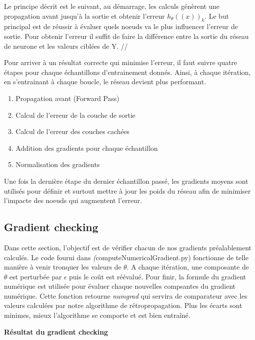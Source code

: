 Le principe décrit est le suivant, au démarrage, les calculs génèrent une propagation avant jusqu'à
la sortie et obtenir l'erreur $h_{\theta}((x))_k$. Le but principal est de réussir à évaluer quels noeuds
va le plus influencer l'erreur de sortie. Pour obtenir l'erreur il suffit de faire la différence entre la
sortie du réseau de neurone et les valeurs ciblées de Y. //

Pour arriver à un résultat correcte qui minimise l'erreur, il faut suivre quatre étapes pour chaque échantillons
d'entrainement donnés. Ainsi, à chaque itération, en s'entrainant à chaque boucle, le réseau devient plus
performant. 

\begin{enumerate}
    \item Propagation avant (Forward Pass)
    \item Calcul de l'erreur de la couche de sortie
    \item Calcul de l'erreur des couches cachées
    \item Addition des gradients pour chaque échantillon
    \item Normalisation des gradients
\end{enumerate}

Une fois la dernière étape du dernier échantillon passé, les gradients moyens sont utilisés pour définir
et surtout mettre à jour les poids du réseau afin de minimiser l'impacte des noeuds qui augmentent l'erreur. 

\subsection{Gradient checking}

Dans cette section, l'objectif est de vérifier chacun de nos gradients préalablement calculés. Le code fourni
dans \textit(computeNumericalGradient.py) fonctionne de telle manière à venir tronquer les valeurs de ${\theta}$. 
A chaque itération, une composante de ${\theta}$ est perturbée par ${\epsilon}$ puis le coût est réévalué. Pour finir,
la formule du gradient numérique est utilisée pour évaluer chaque nouvelles compsantes du gradient numérique. 
Cette fonction retourne \textit{numgrad} qui servira de comparateur avec les valeurs calculées par notre algorithme
de rétropropagation. Plus les écarts sont minimes, mieux l'algorithme se comporte et est bien entraîné.

\vspace{0.4cm}
\noindent
\textbf{Résultat du gradient checking}

